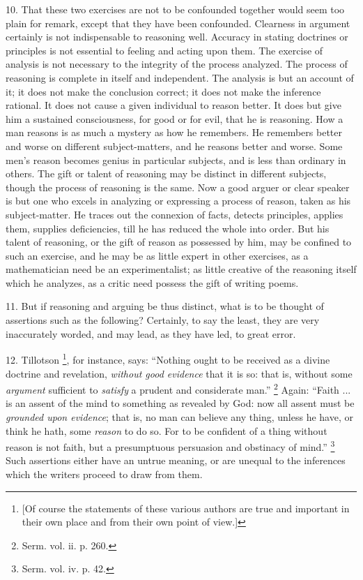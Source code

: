 10. That these two exercises are not to be confounded together
would seem too plain for remark, except that they have been
confounded. Clearness in argument certainly is not indispensable to
reasoning well. Accuracy in stating doctrines or principles is not
essential to feeling and acting upon them. The exercise of analysis is
not necessary to the integrity of the process analyzed. The process of
reasoning is complete in itself and independent. The analysis is but
an account of it; it does not make the conclusion correct; it does not
make the inference rational. It does not cause a given individual to
reason better. It does but give him a sustained consciousness, for
good or for evil, that he is reasoning. How a man reasons is as much a
mystery as how he remembers. He remembers better and worse on
different subject-matters, and he reasons better and worse. Some men's
reason becomes genius in particular subjects, and is less than
ordinary in others. The gift or talent of reasoning may be distinct in
different subjects, though the process of reasoning is the same. Now a
good arguer or clear speaker is but one who excels in analyzing or
expressing a process of reason, taken as his subject-matter. He traces
out the connexion of facts, detects principles, applies them, supplies
deficiencies, till he has reduced the whole into order. But his talent
of reasoning, or the gift of reason as possessed by him, may be
confined to such an exercise, and he may be as little expert in other
exercises, as a mathematician need be an experimentalist; as little
creative of the reasoning itself which he analyzes, as a critic need
possess the gift of writing poems.

11. But if reasoning and arguing be thus distinct, what is to be
thought of assertions such as the following? Certainly, to say the
least, they are very inaccurately worded, and may lead, as they have
led, to great error.

12. Tillotson \footnote{[Of course the statements of these various authors are true and
important in their own place and from their own point of view.]}, for
instance, says: ``Nothing ought to be received as a divine
doctrine and revelation, \emph{without good evidence} that it is so:
that is, without some \emph{argument} sufficient to \emph{satisfy} a
prudent and considerate man.'' \footnote{Serm. vol. ii.
p. 260.} Again: ``Faith ... is an assent of the mind to something as
revealed by God: now all assent must be \emph{grounded upon evidence};
that is, no man can believe any thing, unless he have, or think he
hath, some \emph{reason} to do so. For to be confident of a thing
without reason is not faith, but a presumptuous persuasion and
obstinacy of mind.'' \footnote{Serm. vol. iv.
p. 42.}
Such assertions either have an untrue meaning, or are unequal to the
inferences which the writers proceed to draw from them.

